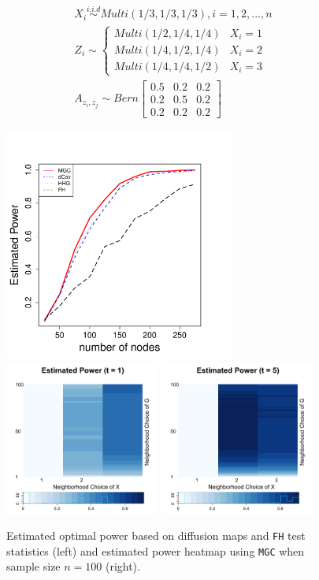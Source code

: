 \documentclass[12pt]{article}
\theoremstyle{definition}
\begin{document}
\begin{equation}
\begin{gathered}
	X_{i} \overset{i.i.d}{\sim} Multi(1/3, 1/3, 1/3), i = 1,2, ... , n \\ 
	Z_{i}  \sim  \left\{  \begin{array}{ccc} Multi(1/2, 1/4, 1/4) & X_{i} = 1 \\ Multi(1/4, 1/2, 1/4) & X_{i} = 2 \\ Multi(1/4, 1/4, 1/2) & X_{i} = 3  \end{array} \right. \\
	A_{z_{i}, z_{j}} \sim Bern \left[  \begin{array}{ccc}   0.5 & 0.2 &  0.2  \\ 0.2 & 0.5 & 0. 2  \\ 0.2 & 0.2 & 0.2  \end{array}  \right]
\end{gathered}
\end{equation}

\begin{figure}[H]
	\centering
	\label{fig:threeSBM}
	\includegraphics[width=3in]{../Figure/threeSBM_2.pdf}
	\includegraphics[width=2in]{../Figure/threeSBM_power1_2.png}
	\includegraphics[width=2in]{../Figure/threeSBM_power5_2.png}
	\caption{Estimated optimal power based on diffusion maps and \texttt{FH} test statistics (left) and estimated power heatmap using \texttt{MGC} when sample size $n = 100$ (right).}
\end{figure}
\newpage
\end{document}
